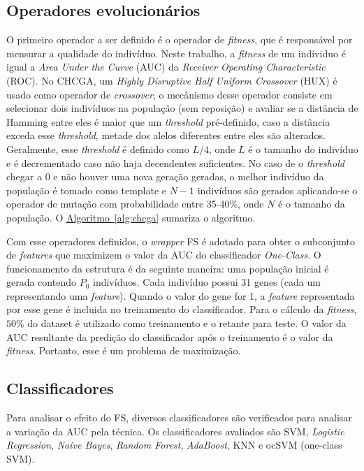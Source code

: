 \documentclass{paper}
\begin{document}
\subsection{Operadores evolucionários}
O primeiro operador a ser definido é o operador de \textit{fitness}, que é
responsável por mensurar a qualidade do indivíduo. Neste trabalho, a
\textit{fitness} de um indíviduo é igual a \textit{Area Under the Curve} (AUC)
da \textit{Receiver Operating Characteristic} (ROC). No CHCGA, um \textit{Highly
  Disruptive Half Uniform Crossover} (HUX) é usado como operador de
\textit{crossover}, o mecânismo desse operador consiste em selecionar dois
indivíduos na população (sem reposição) e avaliar se a distância de Hamming
entre eles é maior que um \textit{threshold} pré-definido, caso a distância
exceda esse \textit{threshold}, metade dos alelos diferentes entre eles são
alterados. Geralmente, esse \textit{threshold} é definido como $L/4$, onde $L$ é
o tamanho do indivíduo e é decrementado caso não haja decendentes suficientes.
No caso de o \textit{threshold} chegar a 0 e não houver uma nova geração
geradas, o melhor indivíduo da população é tomado como template e $N-1$
indivíduos são gerados aplicando-se o operador de mutação com probabilidade
entre 35-40\%, onde $N$ é o tamanho da população. O
\hyperref[alg:chcga]{Algoritmo~\ref*{alg:chcga}} sumariza o algoritmo.

Com esse operadores definidos, o \textit{wrapper} FS é adotado para obter o
subconjunto de \textit{features} que maximizem o valor da AUC do classificador
\textit{One-Class}. O funcionamento da estrutura é da seguinte maneira: uma
população inicial é gerada contendo $P_0$ indivíduos. Cada indivíduo possui 31
genes (cada um representando uma \textit{feature}).  Quando o valor do gene for
1, a \textit{feature} representada por esse gene é incluida no treinamento do
classificador. Para o cálculo da \textit{fitness}, $50\%$ do dataset é utilizado
como treinamento e o retante para teste. O valor da AUC resultante da predição
do classificador após o treinamento é o valor da \textit{fitness}. Portanto,
esse é um problema de maximização.

\subsection{Classificadores}
Para analisar o efeito do FS, diversos classificadores são verificados para
analisar a variação da AUC pela técnica. Os classificadores avaliados são
SVM, \textit{Logistic Regression}, \textit{Naive Bayes}, \textit{Random Forest},
\textit{AdaBoost}, KNN e ocSVM (one-class SVM).
\end{document}
